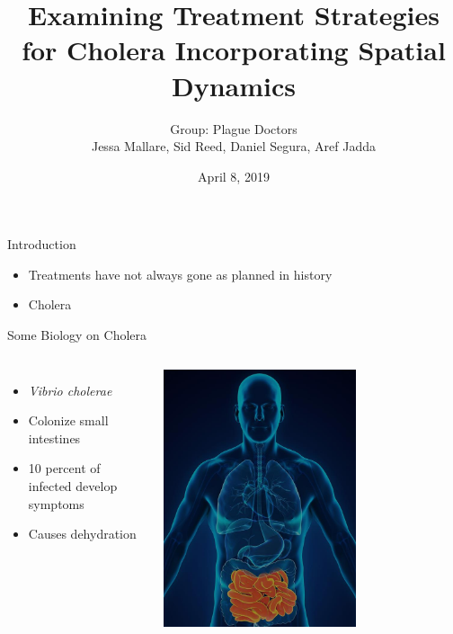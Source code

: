 \documentclass{beamer}\usepackage[]{graphicx}\usepackage[]{color}
\title[Modelling Cholera Treatments]
{Examining Treatment Strategies for Cholera Incorporating Spatial Dynamics}
\author[Plague Doctors]{Group: Plague Doctors \\ Jessa Mallare, Sid Reed, Daniel Segura, Aref Jadda}
\institute[McMaster]{McMaster University \and
Instructor: Dr. David Earn}
\date[April 8, 2019]{April 8, 2019}
\begin{document}
\begin{frame}
\titlepage
\end{frame}

\begin{frame}{Introduction}
\begin{itemize}
\setlength\itemsep{2em}
\item Treatments have not always gone as planned in history
\item Cholera
\end{itemize}
\end{frame}

\begin{frame}{Some Biology on Cholera}
\begin{columns}[onlytextwidth]
\begin{itemize}
\setlength\itemsep{2em}
\item \textit{Vibrio cholerae}
\item Colonize small intestines
\item 10 percent of infected develop symptoms
\item Causes dehydration
\end{itemize}
\includegraphics[width=0.65\textwidth]{images/SI.jpg}
\end{columns}
\end{frame}
\end{document}
